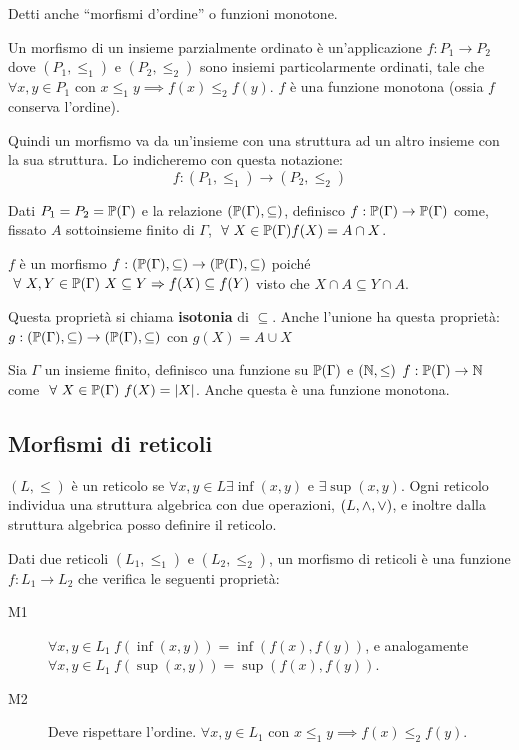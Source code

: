 Detti anche ``morfismi d'ordine'' o funzioni monotone. 
\begin{defn}
Un morfismo di un insieme parzialmente ordinato \`e un'applicazione $f : P_1 \to P_2$ dove $(P_1, \le_{1})$ e $(P_2, \le_{2})$ sono insiemi particolarmente ordinati, tale che $\forall x, y \in P_1$ con $x \le_1 y \implies f(x) \le_2 f(y)$. $f$ \`e una funzione monotona (ossia $f$ conserva l'ordine). 
\end{defn}
Quindi un morfismo va da un'insieme con una struttura ad un altro insieme con la sua struttura. Lo indicheremo con questa notazione:
\[
f : (P_1, \le_{1}) \to (P_2, \le_{2})
\]
\begin{exmp}
Dati $P_1 = P_2 = \mathbb{P}(\Gamma)$ e la relazione $(\mathbb{P}(\Gamma), \subseteq)$, definisco $f : \mathbb{P}(\Gamma) \to \mathbb{P}(\Gamma)$ come, fissato $A$ sottoinsieme finito di $\Gamma$, $\forall X \in \parts(\Gamma) f(X) = A \cap X$.

$f$ \`e un morfismo $f : (\mathbb{P}(\Gamma), \subseteq) \to (\mathbb{P}(\Gamma), \subseteq)$ poich\'e $\forall X, Y \in \parts(\Gamma) \ X \subseteq Y \implies f(X) \subseteq f(Y)$ visto che $X \cap A \subseteq Y \cap A$.
\end{exmp}
Questa propriet\`a si chiama \textbf{isotonia} di $\subseteq$. Anche l'unione ha questa propriet\`a: $g : (\mathbb{P}(\Gamma), \subseteq) \to (\mathbb{P}(\Gamma), \subseteq)$ con $g(X) = A \cup X$

\begin{exmp}
Sia $\Gamma$ un insieme finito, definisco una funzione su $\mathbb{P}(\Gamma)$ e $(\mathbb{N}, \le)$ $f : \mathbb{P}(\Gamma) \to \mathbb{N}$ come $\forall X \in \parts(\Gamma) \ f(X) = \abs{X}$. Anche questa \`e una funzione monotona.
\end{exmp}

\subsection{Morfismi di reticoli}

$(L, \le)$ \`e un reticolo se $\forall x, y \in L \exists \inf(x, y) $ e $ \exists \sup(x,y)$. Ogni reticolo individua una struttura algebrica con due operazioni, $(L, \wedge, \vee)$, e inoltre dalla struttura algebrica posso definire il reticolo.

\begin{defn}
Dati due reticoli $(L_1, \le_1)$ e $(L_2, \le_2)$, un morfismo di reticoli \`e una funzione $f : L_1 \to L_2$ che verifica le seguenti propriet\`a:
\begin{description}
  \item[M1\label{itm:M1}] $\forall x, y \in L_1 \ f(\inf(x,y)) = \inf(f(x),f(y))$, e analogamente $\forall x, y \in L_1 \ f(\sup(x,y)) = \sup(f(x),f(y))$.
  \item[M2\label{itm:M2}] Deve rispettare l'ordine. $\forall x, y \in L_1 $ con $x \le_1 y \implies f(x) \le_2 f(y)$.
\end{description}
\end{defn}

